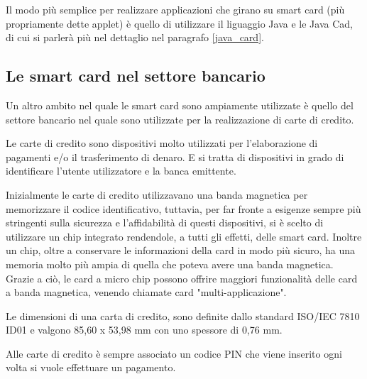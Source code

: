 Il modo più semplice per realizzare applicazioni che girano su smart card (più propriamente dette applet) è quello di utilizzare il liguaggio Java e le Java Cad, di cui si parlerà più nel dettaglio nel paragrafo \ref{java_card}.
\cite{secret_life}

\subsection{Le smart card nel settore bancario}
Un altro ambito nel quale le smart card sono ampiamente utilizzate è quello del settore bancario nel quale sono utilizzate per la realizzazione di carte di credito.

Le carte di credito sono dispositivi molto utilizzati per l'elaborazione di pagamenti e/o il trasferimento di denaro. E si tratta di dispositivi in grado di identificare l'utente utilizzatore e la banca emittente.

Inizialmente le carte di credito utilizzavano una banda magnetica per memorizzare il codice identificativo, tuttavia, per far fronte a esigenze sempre più stringenti sulla sicurezza e l'affidabilità di questi dispositivi, si è scelto di utilizzare un chip integrato rendendole, a tutti gli effetti, delle smart card. Inoltre un chip, oltre a conservare le informazioni della card in modo più sicuro, ha una memoria molto più ampia di quella che poteva avere una banda magnetica. Grazie a ciò, le card a micro chip possono offrire maggiori funzionalità delle card a banda magnetica, venendo chiamate card "multi-applicazione".

Le dimensioni di una carta di credito, sono definite dallo standard ISO/IEC 7810 ID01 e valgono 85,60 x 53,98 mm con uno spessore di 0,76 mm.

Alle carte di credito è sempre associato un codice PIN che viene inserito ogni volta si vuole effettuare un pagamento.

